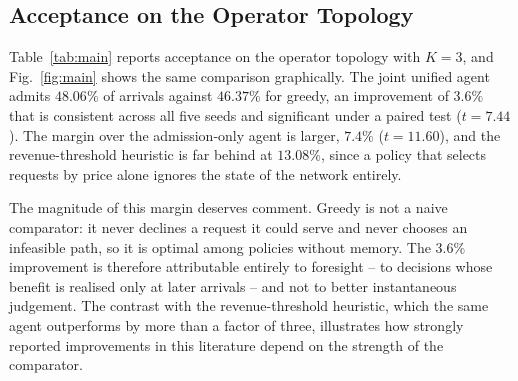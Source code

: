 \documentclass[10pt,journal,comsoc]{IEEEtran}
\begin{document}
\subsection{Acceptance on the Operator Topology}
\label{sec:main}
Table~\ref{tab:main} reports acceptance on the operator topology with
$K=3$, and Fig.~\ref{fig:main} shows the same comparison graphically. The
joint unified agent admits $48.06\%$ of arrivals against $46.37\%$ for
greedy, an improvement of $3.6\%$ that is consistent across all five
seeds and significant under a paired test ($t=7.44$). The margin over the
admission-only agent is larger, $7.4\%$ ($t=11.60$), and the
revenue-threshold heuristic is far behind at $13.08\%$, since a policy
that selects requests by price alone ignores the state of the network
entirely.

The magnitude of this margin deserves comment. Greedy is not a naive
comparator: it never declines a request it could serve and never chooses
an infeasible path, so it is optimal among policies without memory. The
$3.6\%$ improvement is therefore attributable entirely to foresight --
to decisions whose benefit is realised only at later arrivals -- and not
to better instantaneous judgement. The contrast with the
revenue-threshold heuristic, which the same agent outperforms by more
than a factor of three, illustrates how strongly reported improvements in
this literature depend on the strength of the comparator.
\end{document}
